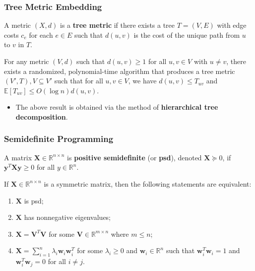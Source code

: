 \documentclass{beamer}
\newcommand{\RR}{\mathbb{R}}
\newcommand{\EE}{\mathbb{E}}
\begin{document}
    \begin{frame}
        \frametitle{Tree Metric Embedding}
    
        \begin{definition}
            A metric $(X, d)$ is a {\bf tree metric} if there exists a tree $T = (V, E)$ with edge costs $c_e$ for each $e \in E$ such that $d(u, v)$ is the cost of the unique path from $u$ to $v$ in $T$.
        \end{definition}

        \pause

        \begin{theorem}
            For any metric $(V, d)$ such that $d(u, v) \geq 1$ for all $u, v \in V$ with $u \neq v$, there exists a randomized, polynomial-time algorithm that produces a tree metric $(V', T), V \subseteq V'$ such that for all $u, v \in V$, we have $d(u, v) \leq T_{uv}$ and $\EE[T_{uv}] \leq O(\log n) d(u, v)$.
        \end{theorem}

        \pause

        \begin{itemize}
            \item The above result is obtained via the method of {\bf hierarchical tree decomposition}.
        \end{itemize}
    \end{frame}

    \begin{frame}
        \frametitle{Semidefinite Programming}
    
        \begin{definition}
            A matrix $\mathbf X \in \RR^{n \times n}$ is {\bf positive semidefinite} (or {\bf psd}), denoted $\mathbf X \succeq 0$, if $\mathbf y^T \mathbf X \mathbf y \geq 0$ for all $y \in \RR^n$.
        \end{definition}

        \begin{fact}
            If $\mathbf X \in \RR^{n \times n}$ is a symmetric matrix, then the following statements are equivalent:
            \begin{enumerate}
                \item $\mathbf X$ is psd;
                \item $\mathbf X$ has nonnegative eigenvalues;
                \item $\mathbf X = \mathbf V^T \mathbf V$ for some $\mathbf V \in \RR^{m \times n}$ where $m \leq n$;
                \item $\mathbf X = \sum_{i = 1}^n \lambda_i \mathbf w_i \mathbf w_i^T$ for some $\lambda_i \geq 0$ and $\mathbf w_i \in \RR^n$ such that $\mathbf w_i^T \mathbf w_i = 1$ and $\mathbf w_i^T \mathbf w_j = 0$ for all $i \neq j$.
            \end{enumerate}
        \end{fact}
    \end{frame}
\end{document}
